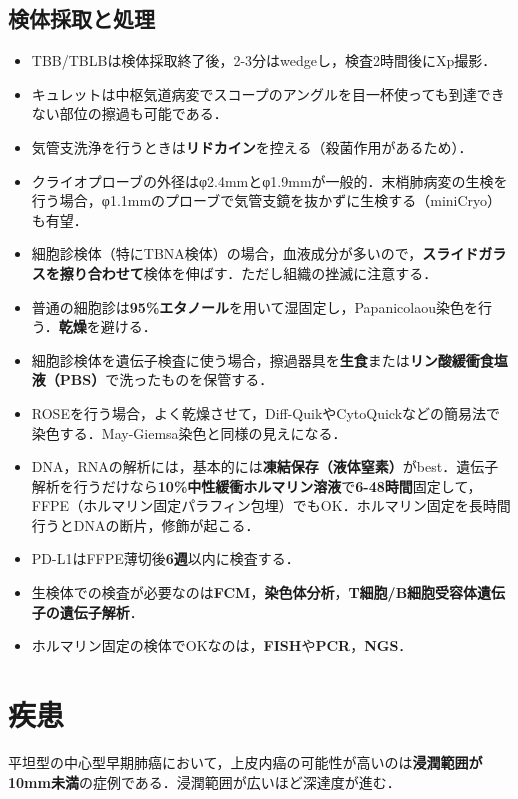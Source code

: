 \subsection{検体採取と処理}
\begin{itemize}

\item TBB/TBLBは検体採取終了後，2-3分はwedgeし，検査2時間後にXp撮影．
\item キュレットは中枢気道病変でスコープのアングルを目一杯使っても到達できない部位の擦過も可能である．
\item 気管支洗浄を行うときは\textbf{リドカイン}を控える（殺菌作用があるため）．
\item クライオプローブの外径はφ2.4mmとφ1.9mmが一般的．末梢肺病変の生検を行う場合，φ1.1mmのプローブで気管支鏡を抜かずに生検する（miniCryo）も有望．
\item 細胞診検体（特にTBNA検体）の場合，血液成分が多いので，\textbf{スライドガラスを擦り合わせて}検体を伸ばす．ただし組織の挫滅に注意する．
\item 普通の細胞診は\textbf{95\%エタノール}を用いて湿固定し，Papanicolaou染色を行う．\textbf{乾燥}を避ける．
\item 細胞診検体を遺伝子検査に使う場合，擦過器具を\textbf{生食}または\textbf{リン酸緩衝食塩液（PBS）}で洗ったものを保管する．
\item ROSEを行う場合，よく乾燥させて，Diff-QuikやCytoQuickなどの簡易法で染色する．May-Giemsa染色と同様の見えになる．
\item DNA，RNAの解析には，基本的には\textbf{凍結保存（液体窒素）}がbest．遺伝子解析を行うだけなら\textbf{10\%中性緩衝ホルマリン溶液}で\textbf{6-48時間}固定して，FFPE（ホルマリン固定パラフィン包埋）でもOK．ホルマリン固定を長時間行うとDNAの断片，修飾が起こる．
\item PD-L1はFFPE薄切後\textbf{6週}以内に検査する．
\item 生検体での検査が必要なのは\textbf{FCM}，\textbf{染色体分析}，\textbf{T細胞/B細胞受容体遺伝子の遺伝子解析}．
\item ホルマリン固定の検体でOKなのは，\textbf{FISH}や\textbf{PCR}，\textbf{NGS}．



\end{itemize}
\newpage


\section{疾患}


平坦型の中心型早期肺癌において，上皮内癌の可能性が高いのは\textbf{浸潤範囲が10mm未満}の症例である．浸潤範囲が広いほど深達度が進む．

